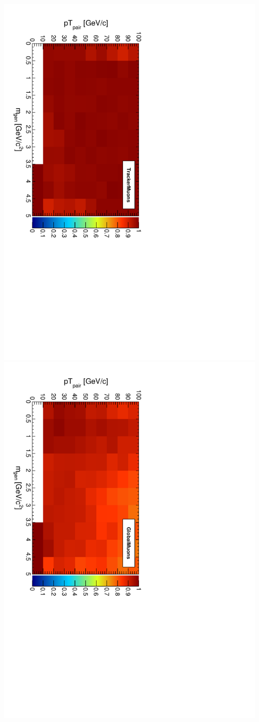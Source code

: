\documentclass[compress]{beamer}
\begin{document}
\begin{frame}
\includegraphics[height=0.5\linewidth, angle=90]{pairptvsmass_TrackerMuons.pdf}
\includegraphics[height=0.5\linewidth, angle=90]{pairptvsmass_GlobalMuons.pdf}
\end{frame}
\end{document}
